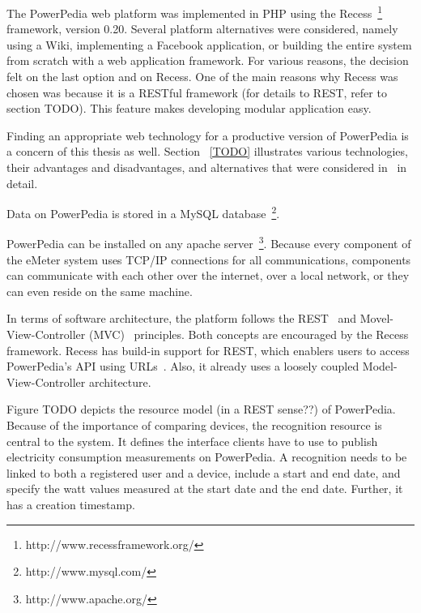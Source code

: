 The PowerPedia web platform was implemented in PHP using the Recess~\footnote{http://www.recessframework.org/} framework, version 0.20. Several platform alternatives were considered, namely using a Wiki, implementing a Facebook application, or building the entire system from scratch with a web application framework. For various reasons, the decision felt on the last option and on Recess. 
One of the main reasons why Recess was chosen was because it is a RESTful framework (for details to REST, refer to section TODO). This feature makes developing modular application easy.

Finding an appropriate web technology for a productive version of PowerPedia is a concern of this thesis as well. Section ~\ref{TODO} illustrates various technologies, their advantages and disadvantages, and alternatives that were considered in~\cite{merklepp} in detail.  

Data on PowerPedia is stored in a MySQL database~\footnote{http://www.mysql.com/}.
  
PowerPedia can be installed on any apache server~\footnote{http://www.apache.org/}. Because every component of the eMeter system uses TCP/IP connections for all communications, components can communicate with each other over the internet, over a local network, or they can even reside on the same machine.

In terms of software architecture, the platform follows the REST~\cite{Fielding2000} and Movel-View-Controller (MVC)~\cite{} principles. Both concepts are encouraged by the Recess framework. Recess has build-in support for REST, which enablers users to access PowerPedia's API using URLs~\cite{weiss:inprocPUC:2012}. Also, it already uses a loosely coupled Model-View-Controller architecture.
 

Figure TODO depicts the resource model (in a REST sense??) of PowerPedia. Because of the importance of comparing devices, the recognition resource is central to the system. It defines the interface clients have to use to publish electricity consumption measurements on PowerPedia. A recognition needs to be linked to both a registered user and a device, include a start and end date, and specify the watt values measured at the start date and the end date. Further, it has a creation timestamp.

